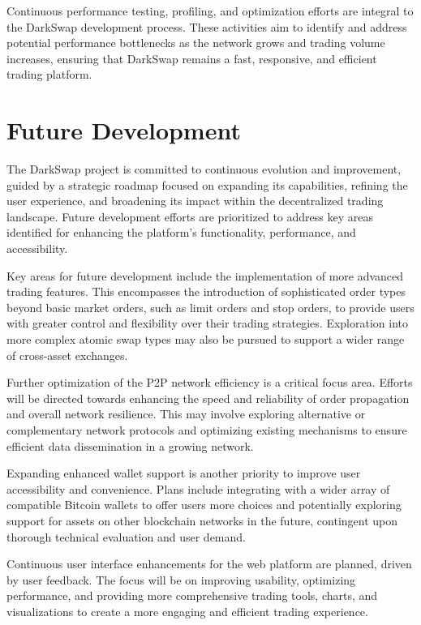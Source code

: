 \documentclass{article}
\begin{document}
Continuous performance testing, profiling, and optimization efforts are integral to the DarkSwap development process. These activities aim to identify and address potential performance bottlenecks as the network grows and trading volume increases, ensuring that DarkSwap remains a fast, responsive, and efficient trading platform.

\section{Future Development}
The DarkSwap project is committed to continuous evolution and improvement, guided by a strategic roadmap focused on expanding its capabilities, refining the user experience, and broadening its impact within the decentralized trading landscape. Future development efforts are prioritized to address key areas identified for enhancing the platform's functionality, performance, and accessibility.

Key areas for future development include the implementation of more advanced trading features. This encompasses the introduction of sophisticated order types beyond basic market orders, such as limit orders and stop orders, to provide users with greater control and flexibility over their trading strategies. Exploration into more complex atomic swap types may also be pursued to support a wider range of cross-asset exchanges.

Further optimization of the P2P network efficiency is a critical focus area. Efforts will be directed towards enhancing the speed and reliability of order propagation and overall network resilience. This may involve exploring alternative or complementary network protocols and optimizing existing mechanisms to ensure efficient data dissemination in a growing network.

Expanding enhanced wallet support is another priority to improve user accessibility and convenience. Plans include integrating with a wider array of compatible Bitcoin wallets to offer users more choices and potentially exploring support for assets on other blockchain networks in the future, contingent upon thorough technical evaluation and user demand.

Continuous user interface enhancements for the web platform are planned, driven by user feedback. The focus will be on improving usability, optimizing performance, and providing more comprehensive trading tools, charts, and visualizations to create a more engaging and efficient trading experience.
\end{document}
